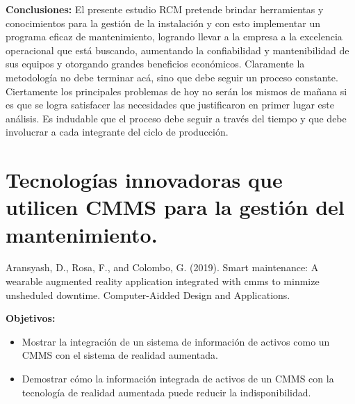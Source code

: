\begin{description}
\item \textbf{Conclusiones:} El presente estudio RCM pretende brindar herramientas y conocimientos para la gestión de la instalación y con esto implementar un programa eficaz de mantenimiento, logrando llevar a la empresa a la excelencia operacional que está buscando, aumentando la confiabilidad y mantenibilidad de sus equipos y otorgando grandes beneficios económicos. 
Claramente la metodología no debe terminar acá, sino que debe seguir un proceso constante. Ciertamente los principales problemas de hoy no serán los mismos de mañana si es que se logra satisfacer las necesidades que justificaron en primer lugar este análisis. Es indudable que el proceso debe seguir a través del tiempo y que debe involucrar a cada integrante del ciclo de producción. 
\end{description}




\section{Tecnologías innovadoras que utilicen CMMS para la gestión del mantenimiento.}

Aransyash, D., Rosa, F., and Colombo, G. (2019). Smart maintenance: A wearable augmented reality application integrated with cmms to minmize unsheduled downtime. Computer-Aidded Design and Applications.


\begin{description}
\item \textbf{Objetivos:}
\begin{itemize}
\item Mostrar la integración de un sistema de información de activos como un CMMS con el sistema de realidad aumentada.
\item Demostrar cómo la información integrada de activos de un CMMS con la tecnología de realidad aumentada puede reducir la indisponibilidad.
\end{itemize}
\end{description}


